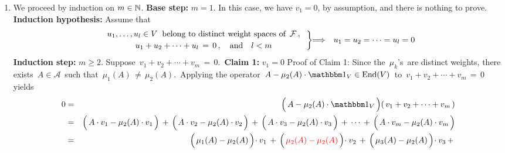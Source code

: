 \begin{enumerate}
\item
    We proceed by induction on $m \in \mathbb{N}$.
    \vskip 0.1cm
    \noindent
    \textbf{Base step:}\; $m = 1$.
    \vskip -0.1cm
    \noindent
    In this case, we have $v_{1} = 0$, by assumption, and there is nothing to prove.
    \vskip 0.1cm
    \noindent
    \textbf{Induction hypothesis:}\; Assume that
    \begin{equation*}
    \left.\begin{array}{c}
    u_{1}, \ldots, u_{l} \in V \;\;\textnormal{belong to distinct weight spaces of \,$\mathcal{F}$}\,,
    \\
    u_{1} + u_{2} + \cdots + u_{l} \,=\, 0\,,
    \quad\textnormal{and}\quad
    \overset{{\color{white}.}}{l < m}
    \end{array}\;\right\}
    \!\!\Longrightarrow\;\;
    \,u_{1} = u_{2} = \cdots = u_{l} = 0
    \end{equation*}
    \vskip 0.1cm
    \noindent
    \textbf{Induction step:}\; $m \geq 2$.
    \vskip 0.01cm
    \noindent
    Suppose \,$v_{1} + v_{2} + \cdots + v_{m} \,=\, 0$.\,
    \vskip 0.2cm
    \noindent
    \textbf{Claim 1:}\;\; $v_{1} = 0$
    \vskip -0.1cm
    Proof of Claim 1:\;
    Since the \,$\mu_{k}$'s\, are distinct weights, there exists \,$A \in \mathcal{A}$\,
    such that \,$\mu_{1}(A) \,\neq\, \mu_{2}(A)$.\,
    Applying the operator
    \,$A - \mu_{2}(A)\cdot\id_{V} \in \End(V)$\,
    to
    \,$v_{1} + v_{2} + \cdots + v_{m} \,=\, 0$\,
    yields
    \begin{eqnarray*}
    0
    & = &
        \left(\,
            A \overset{{\color{white}.}}{-} \mu_{2}(A)\cdot\id_{V}
            \,\right)\!
        (\,v_{1} + v_{2} + \cdots + v_{m}\,)
    \\
    & = &
    \left(\,A \cdot v_{1} \overset{{\color{white}.}}{-} \mu_{2}(A) \cdot v_{1}\,\right)
    \,+\,
    \left(\,A \cdot v_{2} \overset{{\color{white}.}}{-} \mu_{2}(A) \cdot v_{2}\,\right)
    \,+\,
    \left(\,A \cdot v_{3} \overset{{\color{white}.}}{-} \mu_{2}(A) \cdot v_{3}\,\right)
    \,+\,
    \cdots
    \,+\,
    \left(\,A \cdot v_{m} \overset{{\color{white}.}}{-} \mu_{2}(A) \cdot v_{m}\,\right)
    \\
    & = &
    \left(\,\mu_{1}(A) \overset{{\color{white}.}}{-} \mu_{2}(A)\,\right)\!\cdot v_{1}
    \,+\,
    \left(\,{\color{red}\mu_{2}(A) \overset{{\color{white}.}}{-} \mu_{2}(A)}\,\right)\!\cdot v_{2}
    \,+\,
    \left(\,\mu_{3}(A) \overset{{\color{white}.}}{-} \mu_{2}(A)\,\right)\!\cdot v_{3}
    \,+\,

\end{eqnarray*}
\end{enumerate}
